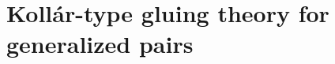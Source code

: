 \documentclass[11pt]{amsart}
\numberwithin{equation}{section}
\newcommand{\Mm}{{\bf{M}}}
\newcommand{\Src}{\mathrm{Src}}
\theoremstyle{definition}
\newtheorem{defn}[thm]{Definition}
\theoremstyle{definition}
\newtheorem{defthm}[thm]{Definition-Theorem}
\theoremstyle{definition}
\begin{document}
\begin{comment}

\subsection{Sources and springs of generalized log canonical centers
}
The following theorem is an analogue of \cite[Theorem-Definition 4.45]{Kol13}. This theorem is for separate interest while We do not need the theorem in the rest of the paper.

\begin{defn}
Let $(X_1,B_1,\Mm^1)$ and $(X_2,B_2,\Mm^2)$ be two glc g-pairs. We say that $(X_1,B_1,\Mm^1)$ and $(X_2,B_2,\Mm^2)$ are in the same \emph{crepant-birational equivalence class} if $\Mm^1=\Mm^2$, and there exist two birational maps $p_1: W\rightarrow X_1$ and $p_2: W\rightarrow X_2$, such that $p_1^*(K_{X_1}+B_1+\Mm^1_{X_1})=p_2^*(K_{X_2}+B_2+\Mm^2_{X_2})$.
\end{defn}


\begin{defthm}\label{thm: kol13 4.45 gpair}
Let $(X,B,\Mm)\rightarrow Y$ be a gdlt crepant log structure and $Z\subset Y$ a glc center with normalization $n: Z^n\rightarrow Z$. Let $S\subset X$ be glc center of $(X,B,\Mm)$ which dominates $Z$ and is minimal with respect to inclusion. Let $(S,B_S,\Mm^S)/Y$ be the gdlt g-pair induced by the adjunction
$$K_S+B_S+\Mm^S_S:=(K_X+B+\Mm_X)|_S$$
and let $f^n_S: S\rightarrow Z_S\rightarrow Z^n$ be the Stein factorization. Then: 
\begin{enumerate}
    \item (Uniqueness of sources) The crepant-birational equivalence class of $(S,B_S,\Mm^S)$ does not depend on the choice of $S$. This crepant-birational equivalence class of $(S,B_S,\Mm^S)$ will be called as the \emph{source of $Z$} and is denoted by $\Src(Z,X,B,\Mm)$.
    \item (Uniqueness of springs)
    \item (Crepant log structure)
    \item (Poincar\'e residue map) (isom is not canonical)
    \item (Galois property)
    \item (Adjunction)
    \item (Birational invariance)
\end{enumerate}
\end{defthm}
\end{comment}

\section{Koll\'ar-type gluing theory for generalized pairs}\label{sec: gluing}
\end{document}
